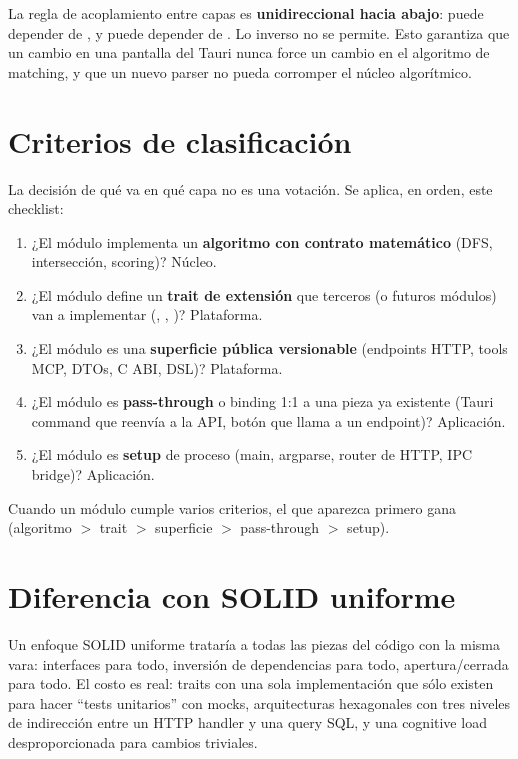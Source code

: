 La regla de acoplamiento entre capas es \textbf{unidireccional hacia
abajo}:  puede depender de , y
 puede depender de . Lo inverso
no se permite. Esto garantiza que un cambio en una pantalla del
Tauri nunca force un cambio en el algoritmo de matching, y que un
nuevo parser no pueda corromper el núcleo algorítmico.

\section{Criterios de clasificación}

La decisión de qué va en qué capa no es una votación. Se aplica,
en orden, este checklist:

\begin{enumerate}
    \item ¿El módulo implementa un \textbf{algoritmo con contrato
    matemático} (DFS, intersección, scoring)? Núcleo.
    \item ¿El módulo define un \textbf{trait de extensión} que
    terceros (o futuros módulos) van a implementar (,
    , )? Plataforma.
    \item ¿El módulo es una \textbf{superficie pública versionable}
    (endpoints HTTP, tools MCP, DTOs, C ABI, DSL)? Plataforma.
    \item ¿El módulo es \textbf{pass-through} o binding 1:1 a una
    pieza ya existente (Tauri command que reenvía a la API, botón
    que llama a un endpoint)? Aplicación.
    \item ¿El módulo es \textbf{setup} de proceso (main, argparse,
    router de HTTP, IPC bridge)? Aplicación.
\end{enumerate}

Cuando un módulo cumple varios criterios, el que aparezca primero
gana (algoritmo $>$ trait $>$ superficie $>$ pass-through $>$ setup).

\section{Diferencia con SOLID uniforme}

Un enfoque SOLID uniforme tratar\'ia a todas las piezas del código
con la misma vara: interfaces para todo, inversión de dependencias
para todo, apertura/cerrada para todo. El costo es real: traits con
una sola implementación que sólo existen para hacer ``tests
unitarios'' con mocks, arquitecturas hexagonales con tres niveles
de indirección entre un HTTP handler y una query SQL, y una
cognitive load desproporcionada para cambios triviales.

